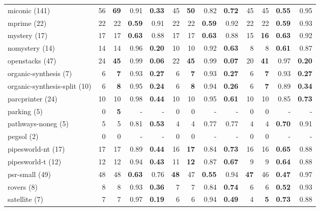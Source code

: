 \begin{tabular}{l||rr|rr||rr|rr||rr|rr}
	miconic (141) & 56 & \textbf{69}  & 0.91 & \textbf{0.33}  & 45 & \textbf{50}  & 0.82 & \textbf{0.72}  & 45 & 45 & \textbf{0.55}  & 0.95\\
	mprime (22) & 22 & 22 & \textbf{0.59}  & 0.91 & 22 & 22 & \textbf{0.59}  & 0.92 & 22 & 22 & \textbf{0.59}  & 0.93\\
	mystery (17) & 17 & 17 & \textbf{0.63}  & 0.88 & 17 & 17 & \textbf{0.63}  & 0.88 & 15 & \textbf{16}  & \textbf{0.63}  & 0.92\\
	nomystery (14) & 14 & 14 & 0.96 & \textbf{0.20}  & 10 & 10 & 0.92 & \textbf{0.63}  & 8 & 8 & \textbf{0.61}  & 0.87\\
	openstacks (47) & 24 & \textbf{45}  & 0.99 & \textbf{0.06}  & 22 & \textbf{45}  & 0.99 & \textbf{0.07}  & 20 & \textbf{41}  & 0.97 & \textbf{0.20} \\
	organic-synthesis (7) & 6 & \textbf{7}  & 0.93 & \textbf{0.27}  & 6 & \textbf{7}  & 0.93 & \textbf{0.27}  & 6 & \textbf{7}  & 0.93 & \textbf{0.27} \\
	organic-synthesis-split (10) & 6 & \textbf{8}  & 0.95 & \textbf{0.24}  & 6 & \textbf{8}  & 0.94 & \textbf{0.26}  & 6 & \textbf{7}  & 0.89 & \textbf{0.34} \\
	parcprinter (24) & 10 & 10 & 0.98 & \textbf{0.44}  & 10 & 10 & 0.95 & \textbf{0.61}  & 10 & 10 & 0.85 & \textbf{0.73} \\
	parking (5) & 0 & \textbf{5}  & - & - & 0 & 0 & - & - & 0 & 0 & - & -\\
	pathways-noneg (5) & 5 & 5 & 0.81 & \textbf{0.53}  & 4 & 4 & 0.77 & 0.77 & 4 & 4 & \textbf{0.70}  & 0.91\\
	pegsol (2) & 0 & 0 & - & - & 0 & 0 & - & - & 0 & 0 & - & - \\
	pipesworld-nt (17) & 17 & 17 & 0.89 & \textbf{0.44}  & 16 & \textbf{17}  & 0.84 & \textbf{0.73}  & 16 & 16 & \textbf{0.65}  & 0.88\\
	pipesworld-t (12) & 12 & 12 & 0.94 & \textbf{0.43}  & 11 & \textbf{12}  & 0.87 & \textbf{0.67}  & 9 & 9 & \textbf{0.64}  & 0.88\\
	psr-small (49) & 48 & 48 & \textbf{0.63}  & 0.76 & \textbf{48}  & 47 & \textbf{0.55}  & 0.94 & \textbf{47}  & 46 & \textbf{0.47}  & 0.97\\
	rovers (8) & 8 & 8 & 0.93 & \textbf{0.36}  & 7 & 7 & 0.84 & \textbf{0.74}  & 6 & 6 & \textbf{0.52}  & 0.93\\
	satellite (7) & 7 & 7 & 0.97 & \textbf{0.19}  & 6 & 6 & 0.94 & \textbf{0.49}  & 4 & \textbf{5}  & \textbf{0.73}  & 0.88\\

\end{tabular}
